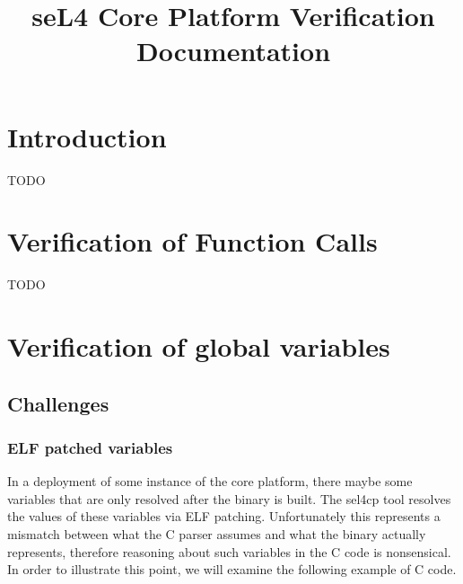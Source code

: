 \documentclass{article}
\begin{document}
\title{seL4 Core Platform Verification Documentation}
\maketitle
\section{Introduction}
TODO 


\section{Verification of Function Calls}
TODO


\section{Verification of global variables}

\subsection{Challenges}

\subsubsection{ELF patched variables}
In a deployment of some instance of the core platform, there maybe some variables that are only resolved after the binary is built. The sel4cp tool resolves the values of these variables via 
ELF patching. Unfortunately this represents a mismatch between what the C parser assumes and what the binary actually represents, therefore reasoning about such variables in the C code is nonsensical.
In order to illustrate this point, we will examine the following example of C code. 


\end{document}

